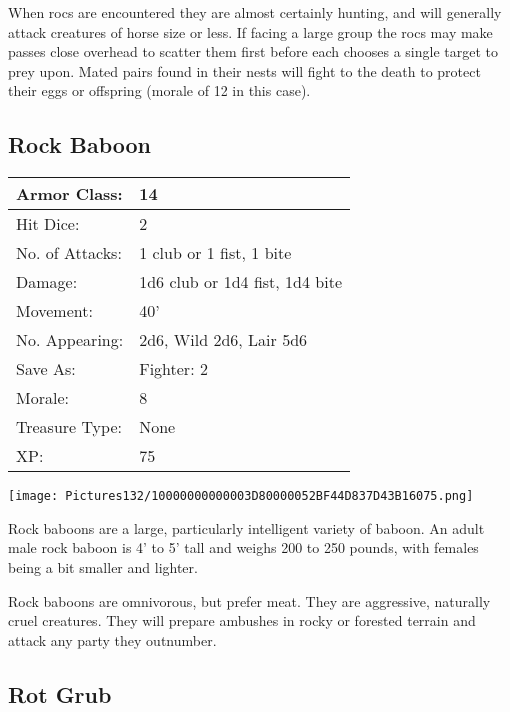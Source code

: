 \documentclass[a4paper,twoside,openany,10pt]{book}
\begin{document}
\begin{multicols}{2}
When rocs are encountered they are almost certainly hunting, and will generally attack creatures of horse size or less. If facing a large group the rocs may make passes close overhead to scatter them first before each chooses a single target to prey upon. Mated pairs found in their nests will fight to the death to protect their eggs or offspring (morale of 12 in this case). 


\subsection*{Rock Baboon}\label{rock-baboon}

\begin{tabularx}{0.50\textwidth}{@{}lX@{}}

Armor Class: & 14 \\\hline
Hit Dice: & 2 \\\hline
No. of Attacks: & 1 club or 1 fist, 1 bite \\\hline
Damage: & 1d6 club or 1d4 fist, 1d4 bite \\\hline
Movement: & 40' \\\hline
No. Appearing: & 2d6, Wild 2d6, Lair 5d6 \\\hline
Save As: & Fighter: 2 \\\hline
Morale: & 8 \\\hline
Treasure Type: & None \\\hline
XP: & 75 \\\hline
\end{tabularx}\medskip

\begin{center} \texttt{[image: Pictures132/10000000000003D80000052BF44D837D43B16075.png]} \end{center}

Rock baboons are a large, particularly intelligent variety of baboon. An adult male rock baboon is 4' to 5' tall and weighs 200 to 250 pounds, with females being a bit smaller and lighter.

Rock baboons are omnivorous, but prefer meat. They are aggressive, naturally cruel creatures. They will prepare ambushes in rocky or forested terrain and attack any party they outnumber.



\subsection*{Rot Grub}\label{rot-grub}


\end{multicols}
\end{document}
